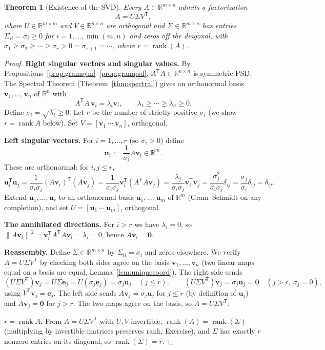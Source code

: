 \documentclass[11pt,oneside]{book}
\theoremstyle{plain}
\newtheorem{theorem}{Theorem}[chapter]
\theoremstyle{definition}
\theoremstyle{remark}
\newcommand{\R}{\mathbb{R}}
\newcommand{\rank}{\operatorname{rank}}
\newcommand{\norm}[1]{\left\lVert #1 \right\rVert}
\newcommand{\T}{^{\mathsf T}}
\newcommand{\bu}{\mathbf{u}}
\newcommand{\bv}{\mathbf{v}}
\newcommand{\be}{\mathbf{e}}
\newcommand{\bzero}{\mathbf{0}}
\begin{document}
\begin{theorem}[Existence of the SVD]\label{thm:svdexist}
Every $A\in\R^{m\times n}$ admits a factorization
\[
A=U\Sigma V\T,
\]
where $U\in\R^{m\times m}$ and $V\in\R^{n\times n}$ are orthogonal and
$\Sigma\in\R^{m\times n}$ has entries $\Sigma_{ii}=\sigma_i\ge0$ for
$i=1,\dots,\min(m,n)$ and zeros off the diagonal, with
$\sigma_1\ge\sigma_2\ge\cdots\ge\sigma_r>0=\sigma_{r+1}=\cdots$, where $r=\rank(A)$.
\end{theorem}
\begin{proof}
\textbf{Right singular vectors and singular values.}
By Propositions~\ref{prop:gramsym}--\ref{prop:grampsd}, $A\T A\in\R^{n\times n}$ is
symmetric PSD. The Spectral Theorem (Theorem~\ref{thm:spectral}) gives an orthonormal
basis $\bv_1,\dots,\bv_n$ of $\R^n$ with
\[
A\T A\,\bv_i=\lambda_i\bv_i,\qquad \lambda_1\ge\cdots\ge\lambda_n\ge0 .
\]
Define $\sigma_i=\sqrt{\lambda_i}\ge0$. Let $r$ be the number of strictly positive
$\sigma_i$ (we show $r=\rank A$ below). Set $V=[\bv_1\ \cdots\ \bv_n]$, orthogonal.

\textbf{Left singular vectors.}
For $i=1,\dots,r$ (so $\sigma_i>0$) define
\[
\bu_i:=\frac{1}{\sigma_i}A\bv_i\in\R^m .
\]
These are orthonormal: for $i,j\le r$,
\[
\bu_i\T\bu_j=\frac{1}{\sigma_i\sigma_j}(A\bv_i)\T(A\bv_j)
=\frac{1}{\sigma_i\sigma_j}\bv_i\T(A\T A\bv_j)
=\frac{\lambda_j}{\sigma_i\sigma_j}\bv_i\T\bv_j
=\frac{\sigma_j^2}{\sigma_i\sigma_j}\delta_{ij}
=\frac{\sigma_j}{\sigma_i}\delta_{ij}=\delta_{ij}.
\]
Extend $\bu_1,\dots,\bu_r$ to an orthonormal basis $\bu_1,\dots,\bu_m$ of $\R^m$
(Gram--Schmidt on any completion), and set $U=[\bu_1\ \cdots\ \bu_m]$, orthogonal.

\textbf{The annihilated directions.}
For $i>r$ we have $\lambda_i=0$, so
$\norm{A\bv_i}^2=\bv_i\T A\T A\bv_i=\lambda_i=0$, hence $A\bv_i=\bzero$.

\textbf{Reassembly.}
Define $\Sigma\in\R^{m\times n}$ by $\Sigma_{ii}=\sigma_i$ and zeros elsewhere. We verify
$A=U\Sigma V\T$ by checking both sides agree on the basis $\bv_1,\dots,\bv_n$ (two linear
maps equal on a basis are equal, Lemma~\ref{lem:uniquecoord}). The right side sends
\[
(U\Sigma V\T)\bv_j=U\Sigma\be_j=U(\sigma_j\be_j)=\sigma_j\bu_j\quad(j\le r),\qquad
(U\Sigma V\T)\bv_j=\sigma_j\bu_j=\bzero\quad(j>r,\ \sigma_j=0),
\]
using $V\T\bv_j=\be_j$. The left side sends $A\bv_j=\sigma_j\bu_j$ for $j\le r$ (by
definition of $\bu_j$) and $A\bv_j=\bzero$ for $j>r$. The two maps agree on the basis,
so $A=U\Sigma V\T$.

\textbf{$r=\rank A$.}
From $A=U\Sigma V\T$ with $U,V$ invertible, $\rank(A)=\rank(\Sigma)$ (multiplying by
invertible matrices preserves rank, Exercise), and $\Sigma$ has exactly $r$ nonzero
entries on its diagonal, so $\rank(\Sigma)=r$.
\end{proof}
\end{document}
